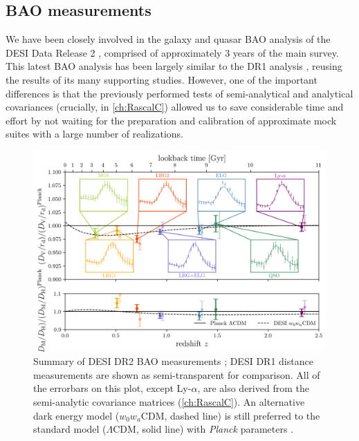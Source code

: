 \subsection{BAO measurements}

We have been closely involved in the galaxy and quasar BAO analysis of the DESI Data Release 2 \citep[DR2,][]{DESI.DR2.DR2}, comprised of approximately 3 years of the main survey.
This latest BAO analysis \citep{DESI.DR2.BAO.cosmo,Y3.clust-s1.Andrade.2025} has been largely similar to the DR1 analysis \citep{DESI2024.III.KP4}, reusing the results of its many supporting studies.
However, one of the important differences is that the previously performed tests of semi-analytical and analytical covariances (crucially, \rascalc{} in \cref{ch:RascalC}) allowed us to save considerable time and effort by not waiting for the preparation and calibration of approximate mock suites with a large number of realizations.

\begin{figure}[htbp]
    \centering
    \includegraphics[width=\textwidth]{DESI-key/DR2/bao_measurements_with_y1_diagram_z_fiducial.png}
    \caption[Summary of DESI DR2 BAO measurements]{Summary of DESI DR2 BAO measurements \citep[figure by Arnaud de Mattia based on][]{DESI.DR2.BAO.cosmo,DESI.DR2.BAO.lya,DESI2024.III.KP4,DESI2024.IV.KP6};
    DESI DR1 distance measurements are shown as semi-transparent for comparison.
    All of the errorbars on this plot, except Ly-$\alpha$, are also derived from the \rascalc{} semi-analytic covariance matrices (\cref{ch:RascalC}).
    An alternative dark energy model ($w_0w_a$CDM, dashed line) is still preferred to the standard model ($\Lambda$CDM, solid line) with {\it Planck} parameters \citep{Planck2018-cosmo}.}
    \label{fig:DESI-DR2-BAO-diagram}
\end{figure}

